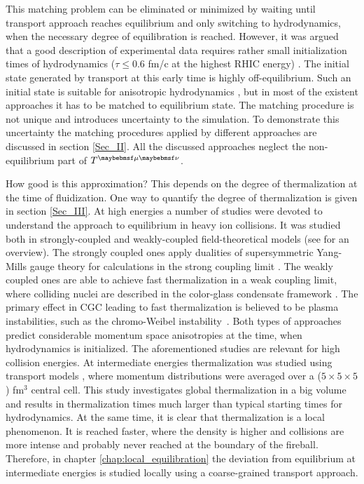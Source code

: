 This matching problem can be eliminated or minimized by waiting until transport
approach reaches equilibrium and only switching to hydrodynamics, when the necessary
degree of equilibration is reached. However, it was argued that a good description of
experimental data requires rather small initialization times of hydrodynamics
($\tau \leq 0.6$ fm/c at the highest RHIC energy) \cite{Heinz:2004pj}. The initial state
generated by transport at this early time is highly off-equilibrium. Such an initial
state is suitable for anisotropic hydrodynamics \cite{Strickland:2014pga},
but in most of the existent approaches it has to be matched to equilibrium state.
The matching procedure is not unique and introduces uncertainty to the simulation. 
To demonstrate this uncertainty the matching procedures applied by different
approaches are discussed in section \ref{Sec_II}. All the discussed approaches
neglect the non-equilibrium part of $\Tmn$.

How good is this approximation? This depends on
the degree of thermalization at the time of fluidization. One way to quantify the
degree of thermalization is given in section \ref{Sec_III}. At high energies
a number of studies were devoted to understand the approach to equilibrium
in heavy ion collisions. It was studied both in strongly-coupled and weakly-coupled
field-theoretical models (see \cite{Strickland:2013uga} for an overview). The strongly
coupled ones apply dualities of supersymmetric Yang-Mills gauge theory for
calculations in the strong coupling limit \cite{Heller:2011ju,vanderSchee:2013pia}.
The weakly coupled ones are able to achieve fast thermalization in a weak coupling
limit, where colliding nuclei are described in the color-glass condensate framework
\cite{Gelis:2010nm,Lappi:2010ek}. The primary effect in CGC
leading to fast thermalization is believed to be plasma instabilities, such as
the chromo-Weibel instability~\cite{Arnold:2004ti}. Both types of approaches
predict considerable momentum space anisotropies at the time, when
hydrodynamics is initialized. The aforementioned studies are relevant for high
collision energies. At intermediate energies thermalization was studied using
transport models \cite{Bravina:2008ra}, where momentum distributions were
averaged over a ($5 \times 5 \times 5$) fm$^3$ central cell. This study
investigates global thermalization in a big volume and results in thermalization
times much larger than typical starting times for hydrodynamics. At the same
time, it is clear that thermalization is a local phenomenon. It is reached faster,
where the density is higher and collisions are more intense and probably never reached
at the boundary of the fireball. Therefore, in chapter \ref{chap:local_equilibration}
the deviation from equilibrium at intermediate energies is studied locally using
a coarse-grained transport approach.

